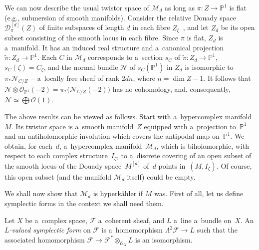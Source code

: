 \documentclass[pdftex]{sigma}
\numberwithin{equation}{section}
\begin{document}
\begin{Remark}\label{twistor}
We can now describe the usual twistor space of ${\mathcal{M}}_d$ as long as $\pi:Z\to {\mathbb{P}}^1$ is f\/lat (e.g.,
submersion of smooth manifolds).
Consider the relative Douady space ${\mathcal{D}}^{[d]}_\pi(Z)$ of f\/inite subspaces of length $d$ in each f\/ibre
$Z_\zeta$~\cite{Pour}, and let $Z_d$ be its open subset consisting of the smooth locus in each f\/ibre.
Since $\pi$ is f\/lat, $Z_d$ is a~manifold.
It has an induced real structure and a~canonical projection $\tilde\pi:Z_d\to {\mathbb{P}}^1$.
Each $C$ in ${\mathcal{M}}_d$ corresponds to a~section $s_C$ of $\tilde\pi:Z_d\to {\mathbb{P}}^1$, $s_C(\zeta)=C_\zeta$,
and the normal bundle ${\mathcal{N}}$ of $s_C({\mathbb{P}}^1)$ in $Z_d$ is isomorphic to $\pi_\ast {\mathcal{N}}_{C/Z}$~-- a~locally free sheaf of rank $2dn$, where $n=\dim Z-1$.
It follows that ${\mathcal{N}}\otimes{\mathcal{O}}_{{\mathbb{P}}^1}(-2)=\pi_\ast \bigl({\mathcal{N}}_{C/Z}(-2)\bigr)$
has no cohomology, and, consequently, ${\mathcal{N}}\simeq \bigoplus{\mathcal{O}}(1)$.
\end{Remark}

\begin{Remark}
The above results can be viewed as follows.
Start with a~hypercomplex mani\-fold~$M$.
Its twistor space is a~smooth mani\-fold~$Z$ equipped with a~projection to~${\mathbb{P}}^1$ and an antiholomorphic
involution which covers the antipodal map on~${\mathbb{P}}^1$.
We obtain, for each~$d$, a~hypercomplex mani\-fold~${\mathcal{M}}_d$, which is biholomorphic, with respect to each complex
structure~$I_\zeta$, to a~discrete covering of an open subset of the smooth locus of the Douady space~$M^{[d]}$ of~$d$
points in~$(M,I_\zeta)$.
Of course, this open subset (and the manifold ${\mathcal{M}}_d$ itself) could be empty.
\end{Remark}

We shall now show that ${\mathcal{M}}_d$ is hyperk\"ahler if $M$ was.
First of all, let us def\/ine symplectic forms in the context we shall need them.
\begin{Definition}
Let $X$ be a~complex space, ${\mathcal{F}}$ a~coherent sheaf, and $L$ a~line a~bundle on~$X$.
An {\em $L$-valued symplectic form} on ${\mathcal{F}}$ is a~homomorphism $\Lambda^2{\mathcal{F}}\to L$ such that the
associated homomorphism ${\mathcal{F}}\to {\mathcal{F}}^\ast\otimes_{{\mathcal{O}}_X} L$ is an isomorphism.
\end{Definition}
\end{document}

